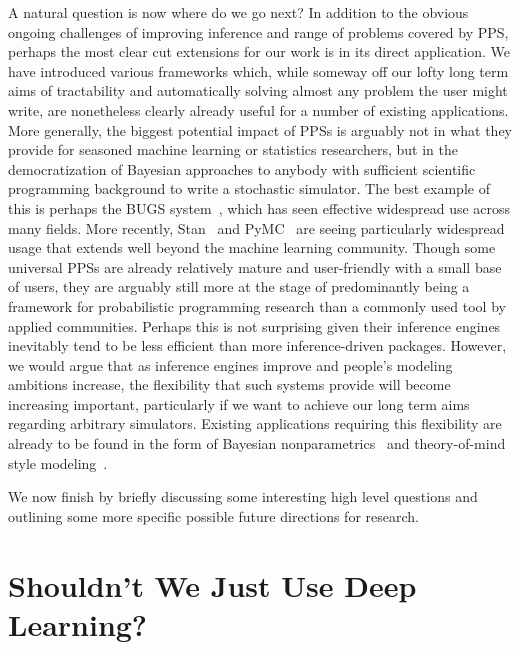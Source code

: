 A natural question is now where do we go next?  In addition to the obvious ongoing challenges
of improving inference and range of problems covered by PPS, perhaps the most clear cut 
extensions for our
work is in its direct application.  We have introduced various frameworks which, while someway off
our lofty long term aims of tractability and automatically solving almost any problem the 
user might write, are nonetheless clearly already useful for a number of existing applications.  
More generally, the biggest
potential impact of PPSs is arguably not in what they provide for seasoned machine learning or 
statistics researchers, but in the democratization of Bayesian approaches to anybody with sufficient
scientific programming background to write a stochastic simulator.  The best example of this is
perhaps the BUGS system~\cite{spiegelhalter1996bugs}, which has seen effective widespread use across
many fields.
More recently, Stan~\cite{carpenter2015stan} and PyMC~\citep{salvatier2016probabilistic} 
are seeing particularly widespread usage that extends well beyond
the machine learning community.  Though some universal PPSs are already relatively 
mature and user-friendly with a small base of users, they are arguably still more
at the stage of predominantly being a framework for probabilistic programming
research than a commonly used tool by applied communities.  Perhaps this is not surprising given
their inference engines inevitably tend to be less efficient than more inference-driven packages.
However, we would argue that as inference engines improve and people's modeling ambitions
increase, the flexibility that such systems provide will become increasing important,
particularly if we want to achieve our long term aims regarding arbitrary simulators.
Existing applications requiring this flexibility are already to be found in the form of Bayesian
nonparametrics~\citep{dhir2017interpreting} and theory-of-mind style 
modeling~\citep{stuhlmuller2014reasoning}.

We now finish by briefly discussing some interesting high level questions and 
outlining some more specific possible future directions for research. 

\section{Shouldn't We Just Use Deep Learning?}

